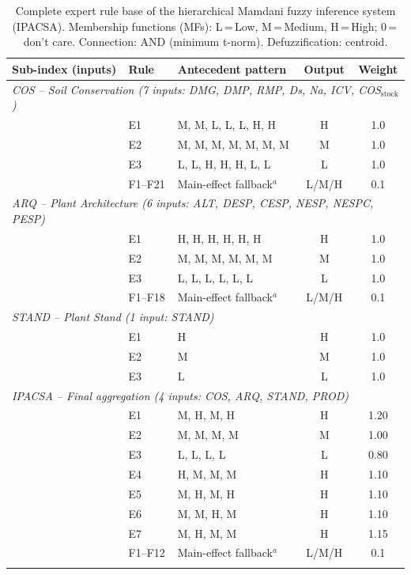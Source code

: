 \documentclass[12pt]{article}
\begin{document}
\clearpage
\begin{table}[ht]
\centering
\caption{Complete expert rule base of the hierarchical Mamdani fuzzy inference system (IPACSA). Membership functions (MFs): L\,=\,Low, M\,=\,Medium, H\,=\,High; 0\,=\,don't care. Connection: AND (minimum t-norm). Defuzzification: centroid.}\label{tab:s2_fuzzy}
\smallskip
\begin{tabular}{p{4.5cm}lp{5cm}cc}
\toprule
Sub-index (inputs) & Rule & Antecedent pattern & Output & Weight \\
\midrule
\multicolumn{5}{l}{\textit{COS -- Soil Conservation (7 inputs: DMG, DMP, RMP, Ds, Na, ICV, COS$_{\text{stock}}$)}} \\
 & E1 & M, M, L, L, L, H, H & H & 1.0 \\
 & E2 & M, M, M, M, M, M, M & M & 1.0 \\
 & E3 & L, L, H, H, H, L, L & L & 1.0 \\
 & F1--F21 & Main-effect fallback$^a$ & L/M/H & 0.1 \\
\midrule
\multicolumn{5}{l}{\textit{ARQ -- Plant Architecture (6 inputs: ALT, DESP, CESP, NESP, NESPC, PESP)}} \\
 & E1 & H, H, H, H, H, H & H & 1.0 \\
 & E2 & M, M, M, M, M, M & M & 1.0 \\
 & E3 & L, L, L, L, L, L & L & 1.0 \\
 & F1--F18 & Main-effect fallback$^a$ & L/M/H & 0.1 \\
\midrule
\multicolumn{5}{l}{\textit{STAND -- Plant Stand (1 input: STAND)}} \\
 & E1 & H & H & 1.0 \\
 & E2 & M & M & 1.0 \\
 & E3 & L & L & 1.0 \\
\midrule
\multicolumn{5}{l}{\textit{IPACSA -- Final aggregation (4 inputs: COS, ARQ, STAND, PROD)}} \\
 & E1 & M, H, M, H & H & 1.20 \\
 & E2 & M, M, M, M & M & 1.00 \\
 & E3 & L, L, L, L & L & 0.80 \\
 & E4 & H, M, M, M & H & 1.10 \\
 & E5 & M, H, M, H & H & 1.10 \\
 & E6 & M, M, H, M & H & 1.10 \\
 & E7 & M, H, M, M & H & 1.15 \\
 & F1--F12 & Main-effect fallback$^a$ & L/M/H & 0.1 \\
\botrule
\end{tabular}
\smallskip

\end{table}
\end{document}
